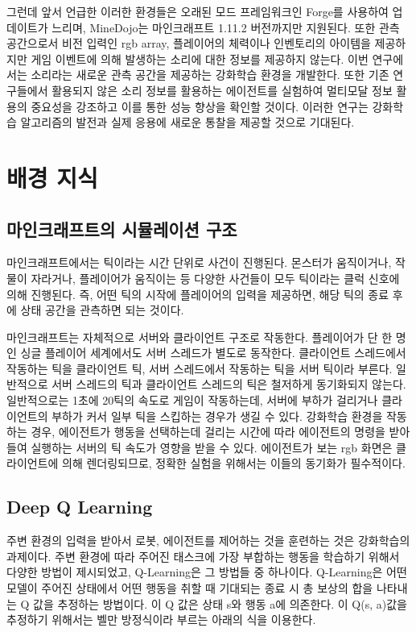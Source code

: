 \documentclass[oneside, under, ko]{snuthesis}
\begin{document}
그런데 앞서 언급한 이러한 환경들은 오래된 모드 프레임워크인 Forge를 사용하여 업데이트가 느리며, MineDojo는 마인크래프트 1.11.2 버전까지만 지원된다. \cite{minedojoGithub} 또한 관측 공간으로서 비전 입력인 rgb array, 플레이어의 체력이나 인벤토리의 아이템을 제공하지만 게임 이벤트에 의해 발생하는 소리에 대한 정보를 제공하지 않는다. 이번 연구에서는 소리라는 새로운 관측 공간을 제공하는 강화학습 환경을 개발한다. 또한 기존 연구들에서 활용되지 않은 소리 정보를 활용하는 에이전트를 실험하여 멀티모달 정보 활용의 중요성을 강조하고 이를 통한 성능 향상을 확인할 것이다. 이러한 연구는 강화학습 알고리즘의 발전과 실제 응용에 새로운 통찰을 제공할 것으로 기대된다.


\chapter{배경 지식}
\section{마인크래프트의 시뮬레이션 구조}
마인크래프트에서는 틱이라는 시간 단위로 사건이 진행된다. 몬스터가 움직이거나, 작물이 자라거나, 플레이어가 움직이는 등 다양한 사건들이 모두 틱이라는 클럭 신호에 의해 진행된다. 즉, 어떤 틱의 시작에 플레이어의 입력을 제공하면, 해당 틱의 종료 후에 상태 공간을 관측하면 되는 것이다.

마인크래프트는 자체적으로 서버와 클라이언트 구조로 작동한다. 플레이어가 단 한 명인 싱글 플레이어 세계에서도 서버 스레드가 별도로 동작한다. 클라이언트 스레드에서 작동하는 틱을 클라이언트 틱, 서버 스레드에서 작동하는 틱을 서버 틱이라 부른다. 일반적으로 서버 스레드의 틱과 클라이언트 스레드의 틱은 철저하게 동기화되지 않는다. 일반적으로는 1초에 20틱의 속도로 게임이 작동하는데, 서버에 부하가 걸리거나 클라이언트의 부하가 커서 일부 틱을 스킵하는 경우가 생길 수 있다. 강화학습 환경을 작동하는 경우, 에이전트가 행동을 선택하는데 걸리는 시간에 따라 에이전트의 명령을 받아들여 실행하는 서버의 틱 속도가 영향을 받을 수 있다. 에이전트가 보는 rgb 화면은 클라이언트에 의해 렌더링되므로, 정확한 실험을 위해서는 이들의 동기화가 필수적이다.

\section{Deep Q Learning \cite{DQN}}
주변 환경의 입력을 받아서 로봇, 에이전트를 제어하는 것을 훈련하는 것은 강화학습의 과제이다. 주변 환경에 따라 주어진 태스크에 가장 부합하는 행동을 학습하기 위해서 다양한 방법이 제시되었고, Q-Learning은 그 방법들 중 하나이다. Q-Learning은 어떤 모델이 주어진 상태에서 어떤 행동을 취할 때 기대되는 종료 시 총 보상의 합을 나타내는 Q 값을 추정하는 방법이다. 이 Q 값은 상태 s와 행동 a에 의존한다. 이 Q(s, a)값을 추정하기 위해서는 벨만 방정식이라 부르는 아래의 식을 이용한다.
\end{document}
